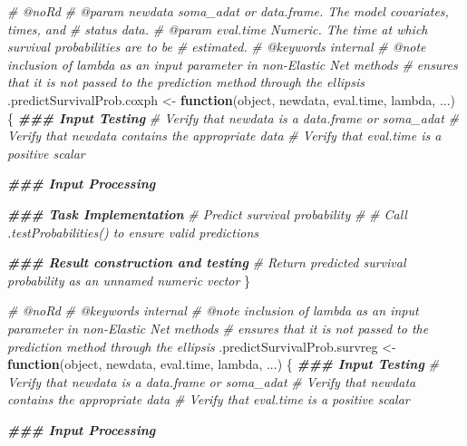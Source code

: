 \documentclass[
]{book}
\newenvironment{Shaded}{\begin{snugshade}}{\end{snugshade}}
\newcommand{\CommentTok}[1]{\textcolor[rgb]{0.56,0.35,0.01}{\textit{#1}}}
\newcommand{\ControlFlowTok}[1]{\textcolor[rgb]{0.13,0.29,0.53}{\textbf{#1}}}
\newcommand{\DocumentationTok}[1]{\textcolor[rgb]{0.56,0.35,0.01}{\textbf{\textit{#1}}}}
\newcommand{\NormalTok}[1]{#1}
\newcommand{\OtherTok}[1]{\textcolor[rgb]{0.56,0.35,0.01}{#1}}
\begin{document}
\begin{Shaded}
\begin{Highlighting}[]
\CommentTok{\#\textquotesingle{} @noRd}
\CommentTok{\#\textquotesingle{} @param newdata soma\_adat or data.frame. The model covariates, times, and}
\CommentTok{\#\textquotesingle{}   status data.}
\CommentTok{\#\textquotesingle{} @param eval.time Numeric. The time at which survival probabilities are to be}
\CommentTok{\#\textquotesingle{}   estimated.}
\CommentTok{\#\textquotesingle{} @keywords internal}
\CommentTok{\#\textquotesingle{} @note inclusion of lambda as an input parameter in non{-}Elastic Net methods }
\CommentTok{\#\textquotesingle{}   ensures that it is not passed to the prediction method through the ellipsis}
\NormalTok{.predictSurvivalProb.coxph }\OtherTok{\textless{}{-}} \ControlFlowTok{function}\NormalTok{(object, newdata, eval.time, lambda, ...) \{}
  \DocumentationTok{\#\#\# Input Testing}
  \CommentTok{\# Verify that \textasciigrave{}newdata\textasciigrave{} is a data.frame or soma\_adat}
  \CommentTok{\# Verify that \textasciigrave{}newdata\textasciigrave{} contains the appropriate data}
  \CommentTok{\# Verify that \textasciigrave{}eval.time\textasciigrave{} is a positive scalar}
  
  \DocumentationTok{\#\#\# Input Processing}
  
  \DocumentationTok{\#\#\# Task Implementation}
  \CommentTok{\# Predict survival probability}
  \CommentTok{\#}
  \CommentTok{\# Call .testProbabilities() to ensure valid predictions}
  
  \DocumentationTok{\#\#\# Result construction and testing}
  \CommentTok{\# Return predicted survival probability as an unnamed numeric vector}
\NormalTok{\}}

\CommentTok{\#\textquotesingle{} @noRd}
\CommentTok{\#\textquotesingle{} @keywords internal}
\CommentTok{\#\textquotesingle{} @note inclusion of lambda as an input parameter in non{-}Elastic Net methods }
\CommentTok{\#\textquotesingle{}   ensures that it is not passed to the prediction method through the ellipsis}
\NormalTok{.predictSurvivalProb.survreg }\OtherTok{\textless{}{-}} \ControlFlowTok{function}\NormalTok{(object, newdata, eval.time, lambda, ...) \{}
  \DocumentationTok{\#\#\# Input Testing}
  \CommentTok{\# Verify that \textasciigrave{}newdata\textasciigrave{} is a data.frame or soma\_adat}
  \CommentTok{\# Verify that \textasciigrave{}newdata\textasciigrave{} contains the appropriate data}
  \CommentTok{\# Verify that \textasciigrave{}eval.time\textasciigrave{} is a positive scalar}
  
  \DocumentationTok{\#\#\# Input Processing}
  

\end{Highlighting}
\end{Shaded}
\end{document}
